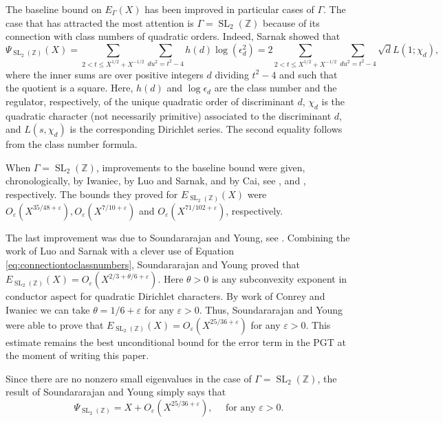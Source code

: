 \documentclass{article}
\theoremstyle{named}
\newcommand{\Z}{\mathbb{Z}}
\DeclareMathOperator{\SL}{SL}
\begin{document}
The baseline bound on $E_\Gamma(X)$ has been improved in particular cases of $\Gamma$. The case that has attracted the most attention is $\Gamma = \SL_2(\Z)$ because of its connection with class numbers of quadratic orders. Indeed, Sarnak showed \cite{sarnak82} that
\begin{equation}\label{eq:connectiontoclassnumbers}
    \Psi_{\SL_2(\Z)}(X) = \sum_{2 < t \leq X^{1/2} + X^{-1/2}}\sum_{du^2 = t^2 - 4} h(d) \log(\epsilon_d^2) = 2\sum_{2 < t \leq X^{1/2} + X^{-1/2}} \sum_{du^2 = t^2 - 4}  \sqrt{d}L(1; \chi_d),
\end{equation}
where the inner sums are over positive integers $d$ dividing $t^2 - 4$ and such that the quotient is a square. Here, $h(d)$ and $\log \epsilon_d$ are the class number and the regulator, respectively, of the unique quadratic order of discriminant $d$, $\chi_d$ is the quadratic character (not necessarily primitive) associated to the discriminant $d$, and $L(s, \chi_d)$ is the corresponding Dirichlet series. The second equality follows from the class number formula. 

When $\Gamma = \SL_2(\Z)$, improvements to the baseline bound were given, chronologically, by Iwaniec, by Luo and Sarnak, and by Cai, see \cite{Iwaniec1984}, \cite{luosarnak} and \cite{Cai2002}, respectively. The bounds they proved for $E_{\SL_2(\Z)}(X)$ were $O_\varepsilon(X^{35/48 + \varepsilon}), O_\varepsilon(X^{7/10 + \varepsilon})$ and $O_\varepsilon(X^{71/102 + \varepsilon})$, respectively. 

The last improvement was due to Soundararajan and Young, see \cite[Theorem 1.1]{Soundararajan_2013}. Combining the work of Luo and Sarnak with a clever use of Equation \eqref{eq:connectiontoclassnumbers}, Soundararajan and Young proved that $E_{\SL_2(\Z)}(X) = O_\varepsilon(X^{2/3 + \theta/6 + \varepsilon})$. Here $\theta > 0$ is any subconvexity exponent in conductor aspect for quadratic Dirichlet characters. By work of Conrey and Iwaniec \cite[Corollary 1.5]{conreyiwaniec} we can take $\theta = 1/6 + \varepsilon$ for any $\varepsilon > 0$. Thus, Soundararajan and Young were able to prove that $E_{\SL_2(\Z)}(X) = O_\varepsilon(X^{25/36 + \varepsilon})$ for any $\varepsilon > 0$. This estimate remains the best unconditional bound for the error term in the PGT at the moment of writing this paper.

Since there are no nonzero small eigenvalues in the case of $\Gamma = \SL_2(\Z)$, the result of Soundararajan and Young simply says that 
\begin{equation*}
    \Psi_{\SL_2(\Z)} = X + O_\varepsilon(X^{25/36 + \varepsilon}), \quad \text{ for any }\varepsilon > 0.
\end{equation*}
\end{document}
